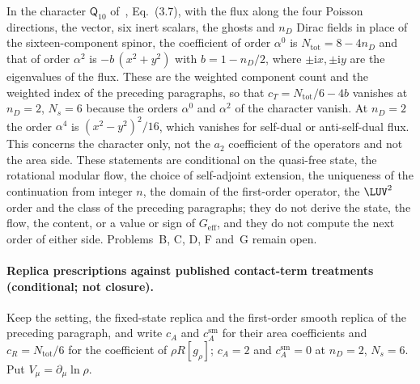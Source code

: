 In the character \(\mathsf Q_{10}\) of~\cite{MantaSteinackerTran2024}, Eq.~(3.7), with the flux along the four Poisson directions, the vector, six inert scalars, the ghosts and \(n_D\) Dirac fields in place of the sixteen-component spinor, the coefficient of order \(\alpha^0\) is \(N_{\mathrm{tot}}=8-4n_D\) and that of order \(\alpha^2\) is \(-b\,(x^2+y^2)\) with \(b=1-n_D/2\), where \(\pm\mathrm ix,\pm\mathrm iy\) are the eigenvalues of the flux. These are the weighted component count and the weighted index of the preceding paragraphs, so that \(c_T=N_{\mathrm{tot}}/6-4b\) vanishes at \(n_D=2\), \(N_s=6\) because the orders \(\alpha^0\) and \(\alpha^2\) of the character vanish. At \(n_D=2\) the order \(\alpha^4\) is \((x^2-y^2)^2/16\), which vanishes for self-dual or anti-self-dual flux. This concerns the character only, not the \(a_2\) coefficient of the operators and not the area side. These statements are conditional on the quasi-free state, the rotational modular flow, the choice of self-adjoint extension, the uniqueness of the continuation from integer \(n\), the domain of the first-order operator, the \(\LUV^2\) order and the class of the preceding paragraphs; they do not derive the state, the flow, the content, or a value or sign of \(G_{\mathrm{eff}}\), and they do not compute the next order of either side. Problems~B, C, D, F and~G remain open.



\paragraph{Replica prescriptions against published contact-term treatments (conditional; not closure).} \label{detail:sec-B-paragraphreplicaprescriptionsa-6}

Keep the setting, the fixed-state replica and the first-order smooth replica of the preceding paragraph, and write \(c_A\) and \(c_A^{\mathrm{sm}}\) for their area coefficients and \(c_R=N_{\mathrm{tot}}/6\) for the coefficient of \(\rho R[g_\rho]\); \(c_A=2\) and \(c_A^{\mathrm{sm}}=0\) at \(n_D=2\), \(N_s=6\). Put \(V_\mu=\partial_\mu\ln\rho\).



